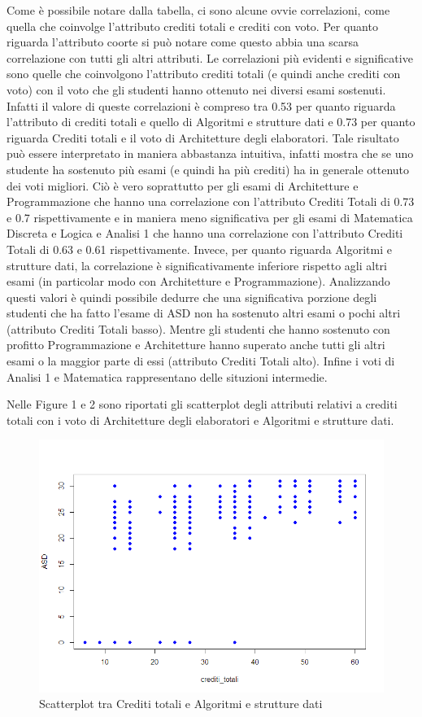 \documentclass[12pt]{article}
\begin{document}
Come è possibile notare dalla tabella, ci sono alcune ovvie correlazioni, come quella che coinvolge l'attributo crediti totali e crediti con voto.
Per quanto riguarda l'attributo coorte si può notare come questo abbia una scarsa correlazione con tutti gli altri attributi.
Le correlazioni più evidenti e significative sono quelle che coinvolgono l'attributo crediti totali (e quindi anche crediti con voto) con il voto che gli studenti hanno ottenuto nei diversi esami sostenuti.
Infatti il valore di queste correlazioni è compreso tra 0.53 per quanto riguarda l'attributo di crediti totali e quello di Algori\-tmi e strutture dati e 0.73 per quanto riguarda Crediti totali e il voto di Architet\-ture degli elaboratori.
Tale risul\-tato può essere interpretato in maniera abbastanza intuitiva, infatti mostra che se uno studente ha soste\-nuto più esami (e quindi ha più crediti) ha in generale ottenuto dei voti migliori.
Ciò è vero soprattutto per gli esami di Architetture e Program\-mazione che hanno una correlazione con l'attributo Crediti Totali di 0.73 e 0.7 rispettivamente e in maniera meno significativa per gli esami di Matema\-tica Discreta e Logica e Analisi 1 che hanno una correlazione con l'attributo Crediti Totali di 0.63 e 0.61 rispettivamente.
Invece, per quanto riguarda Algoritmi e strutture dati, la correlazione è significativamente inferiore rispetto agli altri esami (in particolar modo con Architetture e Program\-mazione). 
Analizzando questi valori è quindi possibile dedurre che una significativa porzione degli studenti che ha fatto l'esame di ASD non ha sostenuto altri esami o pochi altri (attributo Crediti Totali basso).
Mentre gli studenti che hanno sostenuto con profitto Programmazione e Architetture hanno superato anche tutti gli altri esami o la maggior parte di essi (attributo Crediti Totali alto).
Infine i voti di Analisi 1 e Matematica rappresentano delle situzioni intermedie.

Nelle Figure 1 e 2 sono riportati gli scatterplot degli attributi relativi a crediti totali con i voto di Architetture degli elaboratori e Algoritmi e strutture dati.
\begin{figure}[H]
	\includegraphics[width=\textwidth]{img/creditiAsd.png}
	\caption{Scatterplot tra Crediti totali e Algoritmi e strutture dati}
\end{figure}
\end{document}
